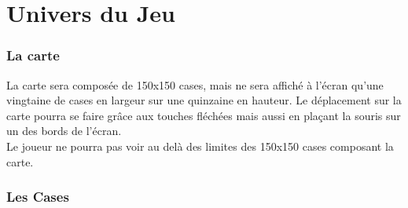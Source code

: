 \documentclass[a4paper]{article}
\newcommand{\alinea}{\hspace*{0.5cm}}
\begin{document}

  \newpage
  \part{Univers du Jeu}
    \section{La carte}

      \alinea La carte sera composée de 150x150 cases, mais ne sera affiché à l'écran qu'une vingtaine de cases en largeur sur une quinzaine en hauteur. Le déplacement sur la carte pourra se faire grâce aux touches fléchées mais aussi en plaçant la souris sur un des bords de l'écran.\\
      Le joueur ne pourra pas voir au delà des limites des 150x150 cases composant la carte.

    \section{Les Cases}
\end{document}
